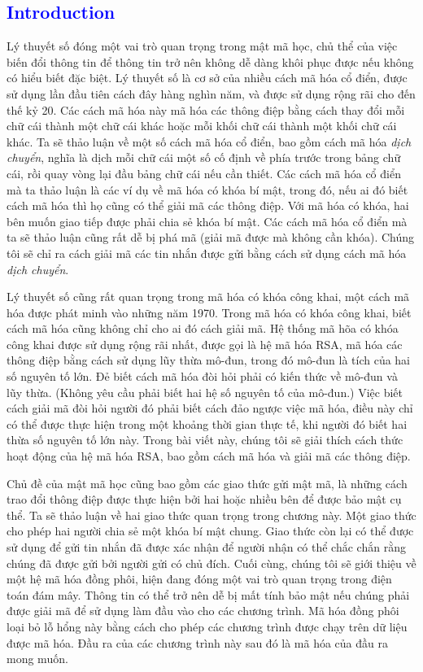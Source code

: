 \textcolor{blue}{\section{Introduction}}
Lý thuyết số đóng một vai trò quan trọng trong mật mã học,
chủ thể của việc biến đổi thông tin để thông tin trở nên không dễ dàng khôi phục được
nếu không có hiểu biết đặc biệt.
Lý thuyết số là cơ sở của nhiều cách mã hóa cổ điển,
được sử dụng lần đầu tiên cách đây hàng nghìn năm,
và được sử dụng rộng rãi cho đến thế kỷ 20.
Các cách mã hóa này mã hóa các thông điệp bằng cách thay đổi mỗi chữ cái thành một chữ cái khác hoặc
mỗi khối chữ cái thành một khối chữ cái khác.
Ta sẽ thảo luận về một số cách mã hóa cổ điển, bao gồm cách mã hóa \textit{dịch chuyển}, nghĩa là dịch mỗi chữ cái một số cố định về phía trước
trong bảng chữ cái, rồi quay vòng lại đầu bảng chữ cái nếu cần thiết.
Các cách mã hóa cổ điển mà ta thảo luận là các ví dụ về
mã hóa có khóa bí mật, trong đó, nếu ai đó biết cách mã hóa thì họ cũng có thể
giải mã các thông điệp.
Với mã hóa có khóa, hai bên muốn giao tiếp được phải chia sẻ khóa bí mật.
Các cách mã hóa cổ điển mà ta sẽ thảo luận cũng rất dễ bị phá mã (giải mã được mà không cần khóa).
Chúng tôi sẽ chỉ ra cách giải mã các tin nhắn được gửi bằng cách sử dụng cách mã hóa \textit{dịch chuyển}.

Lý thuyết số cũng rất quan trọng trong mã hóa có khóa công khai, một cách mã hóa
được phát minh vào những năm 1970. Trong mã hóa có khóa công khai, biết cách mã hóa
cũng không chỉ cho ai đó cách giải mã. Hệ thống mã hõa có khóa công khai được sử dụng rộng
rãi nhất, được gọi là hệ mã hóa RSA, mã hóa các thông điệp bằng cách sử
dụng lũy thừa mô-đun, trong đó mô-đun là tích của hai số nguyên tố lớn. Đẻ biết
cách mã hóa đòi hỏi phải có kiến thức về mô-đun và lũy thừa. (Không yêu cầu phải biết
hai hệ số nguyên tố của mô-đun.) Việc biết cách giải mã đòi
hỏi người đó phải biết cách đảo ngược việc mã hóa, điều này chỉ có thể
được thực hiện trong một khoảng thời gian thực tế, khi người đó biết hai thừa số
nguyên tố lớn này. Trong bài viết này, chúng tôi sẽ giải thích cách thức hoạt động
của hệ mã hóa RSA, bao gồm cách mã hóa và giải mã các thông điệp.

Chủ đề của mật mã học cũng bao gồm các giao thức gửi mật mã, là những cách trao
đổi thông điệp được thực hiện bởi hai hoặc nhiều bên để được
bảo mật cụ thể. Ta sẽ thảo luận về hai giao thức quan trọng trong chương
này. Một giao thức cho phép hai người chia sẻ một khóa bí mật chung. Giao thức còn lại có thể được
sử dụng để gửi tin nhắn đã được xác nhận để người nhận có thể chắc chắn rằng chúng đã được
gửi bởi người gửi có chủ đích. Cuối cùng, chúng tôi sẽ giới thiệu về
một hệ mã hóa đồng phôi, hiện đang đóng một vai trò quan trọng trong điện
toán đám mây. Thông tin có thể trở nên dễ bị mất tính bảo mật nếu chúng phải được giải mã
để sử dụng làm đầu vào cho các chương trình. Mã hóa đồng phôi loại bỏ lỗ hổng
này bằng cách cho phép các chương trình được chạy trên dữ liệu được mã hóa. Đầu
ra của các chương trình này sau đó là mã hóa của đầu ra mong muốn.
